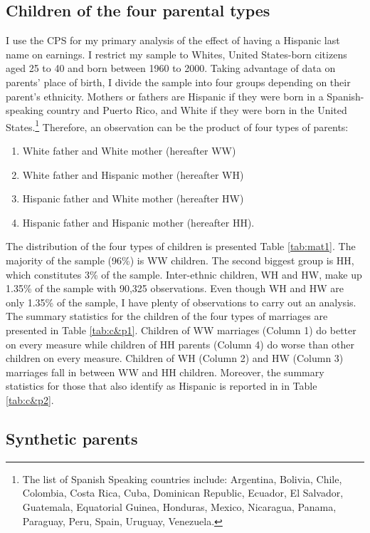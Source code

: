 \subsection{Children of the four parental types}

I use the CPS for my primary analysis of the effect of having a Hispanic last name on earnings. I restrict my sample to Whites, United States-born citizens aged 25 to 40 and born between 1960 to 2000. Taking advantage of data on parents' place of birth, I divide the sample into four groups depending on their parent's ethnicity. Mothers or fathers are Hispanic if they were born in a Spanish-speaking country and Puerto Rico, and White if they were born in the United States.\footnote{The list of Spanish Speaking countries include: Argentina, Bolivia, Chile, Colombia, Costa Rica, Cuba, Dominican Republic, Ecuador, El Salvador, Guatemala, Equatorial Guinea, Honduras, Mexico, Nicaragua, Panama, Paraguay, Peru, Spain, Uruguay, Venezuela.} Therefore, an observation can be the product of four types of parents: 
\begin{enumerate}
\item White father and White mother (hereafter WW) 
\item White father and Hispanic mother (hereafter WH)
\item Hispanic father and White mother (hereafter HW)
\item Hispanic father and Hispanic mother (hereafter HH).
\end{enumerate}

The distribution of the four types of children is presented Table \ref{tab:mat1}. The majority of the sample (96\%) is WW children. The second biggest group is HH, which constitutes 3\% of the sample. Inter-ethnic children, WH and HW, make up 1.35\% of the sample with 90,325 observations. Even though WH and HW are only 1.35\% of the sample, I have plenty of observations to carry out an analysis. The summary statistics for the children of the four types of marriages are presented in Table \ref{tab:c&p1}. Children of WW marriages (Column 1) do better on every measure while children of HH parents (Column 4) do worse than other children on every measure. Children of WH (Column 2) and HW (Column 3) marriages fall in between WW and HH children. Moreover, the summary statistics for those that also identify as Hispanic is reported in in Table \ref{tab:c&p2}.

 
\subsection{Synthetic parents}

